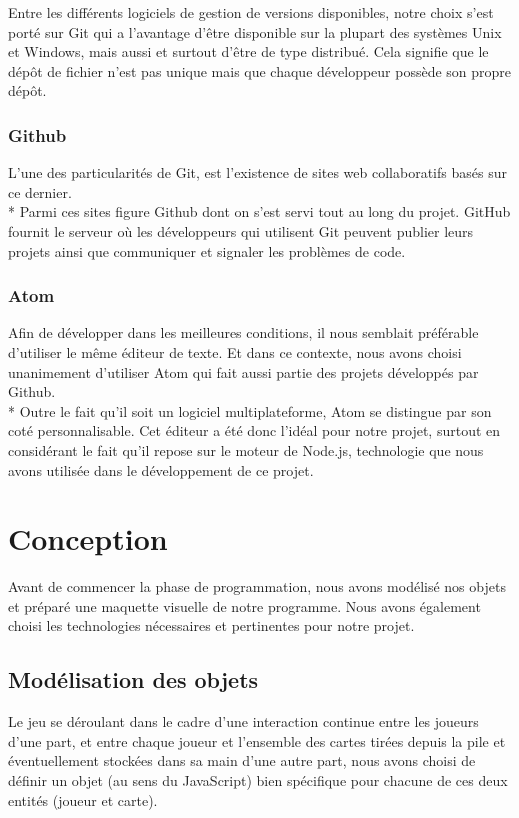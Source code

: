 \documentclass[12pt]{report}
\begin{document}
	 Entre les différents logiciels de gestion de versions disponibles, notre choix s’est porté sur Git qui a l’avantage d’être disponible sur la plupart des systèmes Unix et Windows, mais aussi et surtout d’être  de type distribué. Cela signifie que le dépôt de fichier n’est pas unique mais que chaque développeur possède son propre dépôt.


 \subsection*{Github}
   L’une des particularités de Git, est l’existence de sites web collaboratifs basés sur ce dernier.\\* Parmi ces sites figure Github  dont on s’est  servi tout  au long du projet.
   GitHub fournit le serveur où les développeurs qui utilisent Git peuvent publier leurs projets ainsi que communiquer et signaler les problèmes de code.


 \subsection*{Atom}
   Afin de développer dans les meilleures conditions, il nous semblait préférable d’utiliser le même éditeur de texte.
   Et dans ce contexte, nous avons choisi unanimement d’utiliser Atom qui fait aussi partie des projets développés  par Github.\\*
   Outre le fait qu’il soit un logiciel multiplateforme, Atom se distingue par son coté personnalisable.
   Cet éditeur a été donc l’idéal pour notre projet, surtout en considérant le fait qu’il repose sur le moteur de Node.js, technologie que nous avons utilisée  dans le développement de ce projet.


\chapter{Conception}

	Avant de commencer la phase de programmation, nous avons modélisé nos objets et préparé une maquette visuelle de notre programme. Nous avons également choisi les technologies nécessaires et pertinentes pour notre projet.

    \section{Modélisation des objets}
		Le jeu se déroulant dans le cadre d'une interaction continue entre les joueurs d'une part, et entre chaque joueur et l'ensemble des cartes tirées depuis la pile et éventuellement stockées dans sa main d'une autre part, nous avons choisi de définir un objet (au sens du JavaScript) bien spécifique pour chacune de ces deux entités (joueur et carte).
\end{document}

